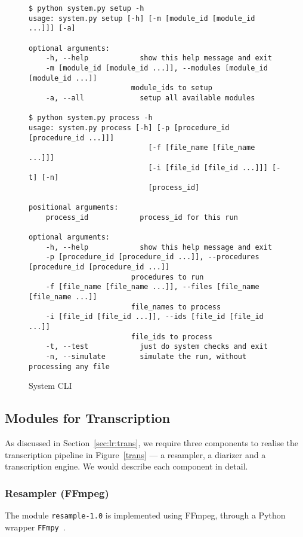 \begin{figure}[ht]
\begin{lstlisting}
$ python system.py setup -h
usage: system.py setup [-h] [-m [module_id [module_id ...]]] [-a]

optional arguments:
    -h, --help            show this help message and exit
    -m [module_id [module_id ...]], --modules [module_id [module_id ...]]
                        module_ids to setup
    -a, --all             setup all available modules

$ python system.py process -h
usage: system.py process [-h] [-p [procedure_id [procedure_id ...]]]
                            [-f [file_name [file_name ...]]]
                            [-i [file_id [file_id ...]]] [-t] [-n]
                            [process_id]

positional arguments:
    process_id            process_id for this run

optional arguments:
    -h, --help            show this help message and exit
    -p [procedure_id [procedure_id ...]], --procedures [procedure_id [procedure_id ...]]
                        procedures to run
    -f [file_name [file_name ...]], --files [file_name [file_name ...]]
                        file_names to process
    -i [file_id [file_id ...]], --ids [file_id [file_id ...]]
                        file_ids to process
    -t, --test            just do system checks and exit
    -n, --simulate        simulate the run, without processing any file
\end{lstlisting}
\caption{System CLI}\label{args}
\end{figure}

\subsection{Modules for Transcription}\label{sec:im:code:trans}

As discussed in Section~\ref{sec:lr:trans}, we require three components
to realise the transcription pipeline in Figure~\ref{trans} --- a resampler,
a diarizer and a transcription engine. We would describe each component in
detail.

\subsubsection{Resampler (FFmpeg)}

The module \texttt{resample-1.0} is implemented using FFmpeg, through a
Python wrapper \texttt{FFmpy}~\cite{ffmpy}.


